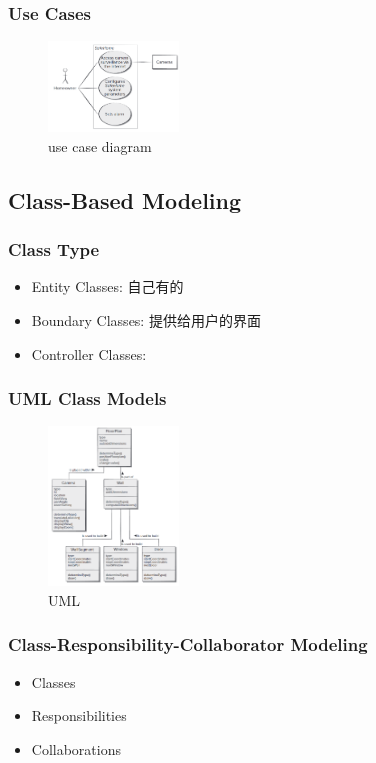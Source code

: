 \subsubsection{Use Cases}

\begin{figure}[!htb]
    \centering
    \includegraphics[width=0.309\textwidth]{pic/SE4/use case diagram}
    \caption{use case diagram}
\end{figure}

\subsection{Class-Based Modeling}

\subsubsection{Class Type}
\begin{itemize}
    \item Entity Classes: 自己有的
    \item Boundary Classes: 提供给用户的界面
    \item Controller Classes: 
\end{itemize}

\subsubsection{UML Class Models}
\begin{figure}[!htb]
    \centering
    \includegraphics[width=0.309\textwidth]{pic/SE4/UML}
    \caption{UML}
\end{figure}


\subsubsection{Class-Responsibility-Collaborator Modeling}
\begin{itemize}
    \item Classes
    \item Responsibilities
    \item Collaborations
\end{itemize}

